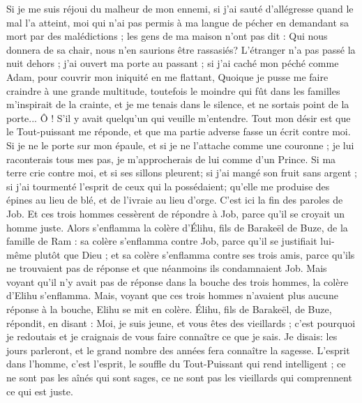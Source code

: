 \begin{multicols}{2}
{Si je me suis réjoui du malheur de mon ennemi, si j'ai sauté d'allégresse quand le mal l'a atteint,
moi qui n'ai pas permis à ma langue de pécher en demandant sa mort par des malédictions ;
les gens de ma maison n'ont pas dit : Qui nous donnera de sa chair, nous n'en saurions être rassasiés?
L'étranger n'a pas passé la nuit dehors ; j'ai ouvert ma porte au passant ;
si j'ai caché mon péché comme Adam, pour couvrir mon iniquité en me flattant,
Quoique je pusse me faire craindre à une grande multitude, toutefois le moindre qui fût dans les familles m'inspirait de la crainte, et je me tenais dans le silence, et ne sortais point de la porte...
Ô ! S'il y avait quelqu'un qui veuille m'entendre. Tout mon désir est que le Tout-puissant me réponde, et que ma partie adverse fasse un écrit contre moi.
Si je ne le porte sur mon épaule, et si je ne l'attache comme une couronne ;
je lui raconterais tous mes pas, je m'approcherais de lui comme d'un Prince.
Si ma terre crie contre moi, et si ses sillons pleurent;
si j'ai mangé son fruit sans argent ; si j'ai tourmenté l'esprit de ceux qui la possédaient;
qu'elle me produise des épines au lieu de blé, et de l'ivraie au lieu d'orge. C'est ici la fin des paroles de Job.
\VerseOne{}Et ces trois hommes cessèrent de répondre à Job, parce qu'il se croyait un homme juste. 
Alors s'enflamma la colère d'Élihu, fils de Barakeël de Buze, de la famille de Ram : sa colère s'enflamma contre Job, parce qu'il se justifiait lui-même plutôt que Dieu ; 
et sa colère s'enflamma contre ses trois amis, parce qu'ils ne trouvaient pas de réponse et que néanmoins ils condamnaient Job. 
Mais voyant qu'il n'y avait pas de réponse dans la bouche des trois hommes, la colère d'Elihu s'enflamma.
Mais, voyant que ces trois hommes n'avaient plus aucune réponse à la bouche, Elihu se mit en colère.
Élihu, fils de Barakeël, de Buze, répondit, en disant : Moi, je suis jeune, et vous êtes des vieillards ; c'est pourquoi je redoutais et je craignais de vous faire connaître ce que je sais. 
Je disais: les jours parleront, et le grand nombre des années fera connaître la sagesse.
L'esprit dans l'homme, c'est l'esprit, le souffle du Tout-Puissant qui rend intelligent ;
ce ne sont pas les aînés qui sont sages, ce ne sont pas les vieillards qui comprennent ce qui est juste.
}
\end{multicols}
